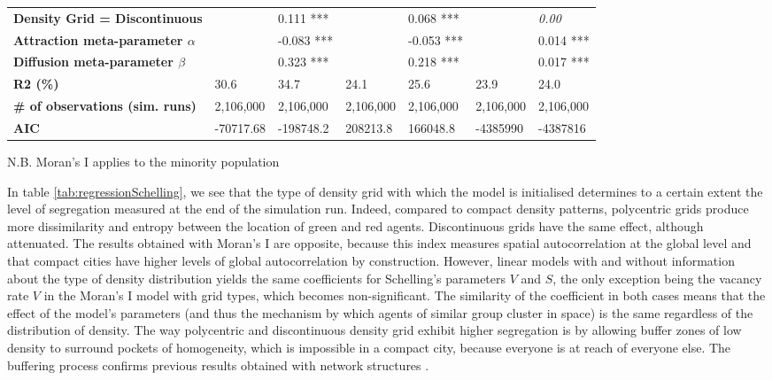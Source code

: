 \documentclass[Royal,sageh,times]{sagej}
\begin{document}
\begin{table}[]
\begin{adjustwidth}{-0.5cm}{-0.5cm}
\begin{tabular}{|m{2.5cm}|ll|ll|ll|}
\textbf{Density Grid = Discontinuous}       &            & 0.111 ***                        &                   & 0.068 ***         &                      & \textit{0.00}              \\
\textbf{Attraction meta-parameter $\alpha$} &            & -0.083 ***                       &                   & -0.053 ***        &                      & 0.014 ***                \\ 
\textbf{Diffusion meta-parameter $\beta$}   &            & 0.323 ***                        &                   & 0.218 ***         &                      & 0.017 ***           \\ \hline
\textbf{R2 (\%)}                            & 30.6       & 34.7                             & 24.1              & 25.6              & 23.9                 & 24.0                    \\ 
\textbf{\# of observations (sim. runs)}     & 2,106,000  & 2,106,000 						 & 2,106,000          & 2,106,000          & 2,106,000             & 2,106,000                \\ 
\textbf{AIC}                                & -70717.68   & -198748.2  						& 208213.8          & 166048.8          & -4385990             & -4387816                 \\ \hline
\end{tabular}
\end{adjustwidth}
N.B. Moran's I applies to the minority population
\end{table}
In table \ref{tab:regressionSchelling}, we see that the type of density grid with which the model is initialised determines to a certain extent the level of segregation measured at the end of the simulation run. Indeed, compared to compact density patterns, polycentric grids produce more dissimilarity and entropy between the location of green and red agents. Discontinuous grids have the same effect, although attenuated. The results obtained with Moran's I are opposite, because this index measures spatial autocorrelation at the global level and that compact cities have higher levels of global autocorrelation by construction. However, linear models with and without information about the type of density distribution yields the same coefficients for Schelling's parameters $V$ and $S$, the only exception being the vacancy rate $V$ in the Moran's I model with grid types, which becomes non-significant. The similarity of the coefficient in both cases means that the effect of the model's parameters (and thus the mechanism by which agents of similar group cluster in space) is the same regardless of the distribution of density. The way polycentric and discontinuous density grid exhibit higher segregation is by allowing buffer zones of low density to surround pockets of homogeneity, which is impossible in a compact city, because everyone is at reach of everyone else. The buffering process confirms previous results obtained with network structures \citep{Banos2012}.
\end{document}
